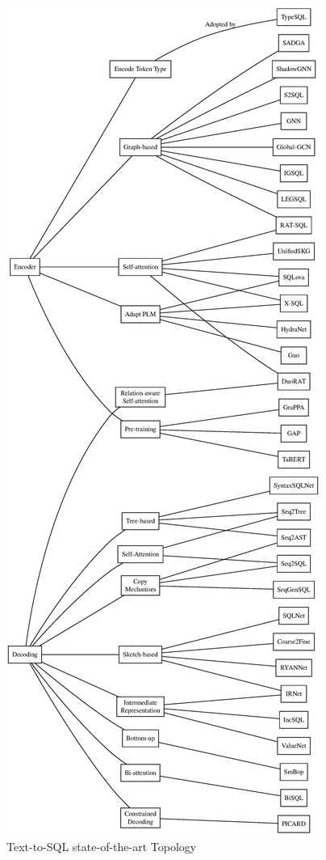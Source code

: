 \begin{figure}
    \centering
    \includegraphics[height=0.98\textheight]{pics/mindmap/methods/map}
    \caption{\small{Text-to-SQL state-of-the-art Topology}}
    \label{fig:mindmap}
\end{figure}